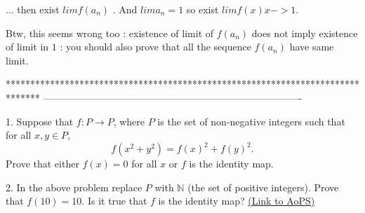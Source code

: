 \begin{solution}
	\begin{tcolorbox}... then exist $limf(a_n)$ . And $lima_n=1$ so exist $limf(x) x->1$. \end{tcolorbox}
Btw, this seems wrong too : existence of limit of $f(a_n)$ does not imply existence of limit in $1$ : you should also prove that all the sequence $f(a_n)$ have same limit.
\end{solution}
*******************************************************************************
-------------------------------------------------------------------------------

\begin{problem}
	1. Suppose that $f: P\to P$, where $P$ is the set of non-negative integers such that for all $x,y \in P$,
\[f(x^2+y^2)=f(x)^2 +f(y)^2.\]
Prove that either $f(x)= 0$ for all $x$ or $f$ is the identity map.

2. In the above problem replace $P$ with $\mathbb N$ (the set of positive integers). Prove that $f(10)=10$. Is it true that $f$ is the identity map?
	\flushright \href{https://artofproblemsolving.com/community/c6h444465}{(Link to AoPS)}
\end{problem}



